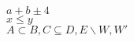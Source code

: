 \documentclass[12pt]{article}
\begin{document}
$a+b\pm 4$  \\
$x \leq y$ \\
$  A  \subset B, C \subseteq D, E \backslash W , W\prime  $
\end{document}
